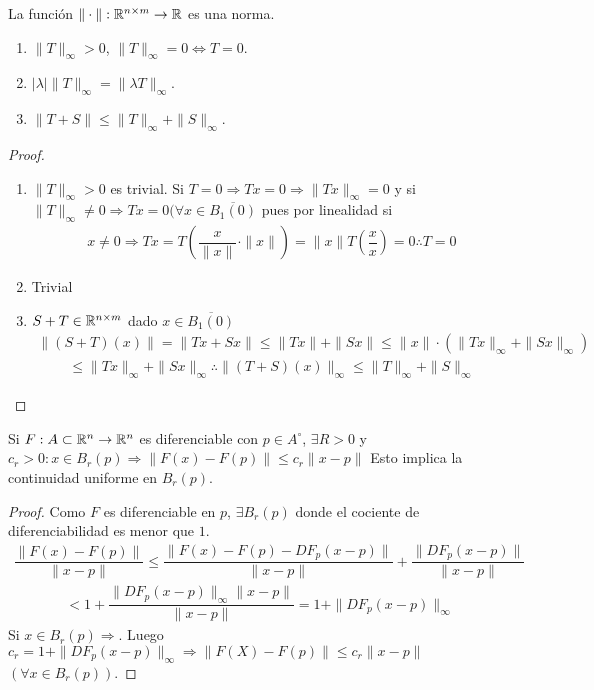 \begin{lemma}
  La función $\| \cdot \|: \mathbb{R}^{n \times m} \to \mathbb{R}$ es una norma.
  \begin{enumerate}
    \item $\|T\|_{\infty} > 0$, $\|T\|_{\infty} = 0 \iff T = 0$.
    \item $|\lambda| \|T\|_{\infty} = \|\lambda T\|_{\infty}$.
    \item $\| T + S\| \leq \|T\|_{\infty} + \|S\|_{\infty}$.
  \end{enumerate}
  \begin{proof}
    \begin{enumerate}
      \item $\|T\|_{\infty} > 0$ es trivial. Si $T = 0 \Rightarrow Tx = 0 \Rightarrow \|Tx\|_{\infty} = 0$ y si $\|T\|_{\infty} \neq 0 \Rightarrow Tx=0 (\forall x \in \overline{B_1(0)}$ pues por linealidad si
            \begin{align*}
              x \neq 0 \Rightarrow Tx = T(\dfrac{x}{\|x\|} \cdot \|x\|) = \|x\| T(\dfrac{x}{x}) = 0 \therefore T = 0
            \end{align*}
      \item Trivial
      \item $S + T \in \mathbb{R}^{n \times m}$ dado $x \in \overline{B_1(0)}$ \begin{align*}
              \|(S+T)(x)\| = \| Tx + Sx \| \leq \|Tx\| + \|Sx\| \leq  \|x\| \cdot (\|Tx\|_{\infty} + \|Sx\|_{\infty})
            \end{align*}
            \begin{align*}
              \leq \|Tx\|_{\infty} + \|Sx\|_{\infty} \therefore \|(T+S)(x)\|_{\infty} \leq \|T\|_{\infty} + \|S\|_{\infty}
            \end{align*}
    \end{enumerate}
  \end{proof}
\end{lemma}

\clearpage

\begin{lemma}
  Si $F: A \subset \mathbb{R}^n \to \mathbb{R}^n$ es diferenciable con $p \in A^{\circ}$, $\exists R > 0$ y $c_r > 0 : x \in B_r(p) \Rightarrow \| F(x) - F(p) \| \leq c_r \| x - p\|$
  Esto implica la continuidad uniforme en $B_r(p)$.
  \begin{proof}
    Como $F$ es diferenciable en $p$, $\exists B_r(p)$ donde el cociente de diferenciabilidad es menor que $1$. \begin{align*}
      \dfrac{\|F(x) - F(p)\|}{\|x - p \|} \leq \dfrac{\|F(x) - F(p) - DF_p(x-p) \|}{\|x-p\|} + \dfrac{\| DF_p(x-p) \|}{\|x-p\|}
    \end{align*}
    \begin{align*}
      < 1 + \dfrac{\|DF_p(x-p)\|_{\infty} \|x-p\|}{\|x-p\|} = 1 + \|DF_p(x-p)\|_{\infty}
    \end{align*}
    Si $x \in B_r(p) \Rightarrow$. Luego $c_r = 1 + \|DF_p(x-p)\|_{\infty} \Rightarrow \|F(X) - F(p)\| \leq c_r \|x-p\|$ $(\forall x \in B_r(p))$.
  \end{proof}
\end{lemma}
